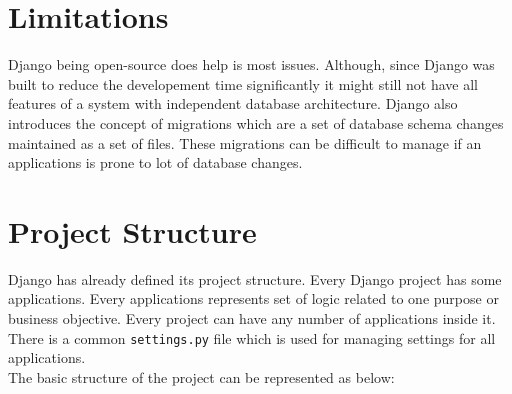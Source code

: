 \section{\textbf{Limitations}}
Django being open-source does help is most issues. Although, since Django was
built to reduce the developement time significantly it might still not have
all features of a system with independent database architecture. Django also
introduces the concept of migrations which are a set of database schema changes
maintained as a set of files. These migrations can be difficult to manage if
an applications is prone to lot of database changes.

\section{\textbf{Project Structure}}
Django has already defined its project structure. Every Django project has some
applications. Every applications represents set of logic related to one purpose
or business objective. Every project can have any number of applications inside
it. There is a common \texttt{settings.py} file which is used for managing
settings for all applications.\\
The basic structure of the project can be represented as below:\\

